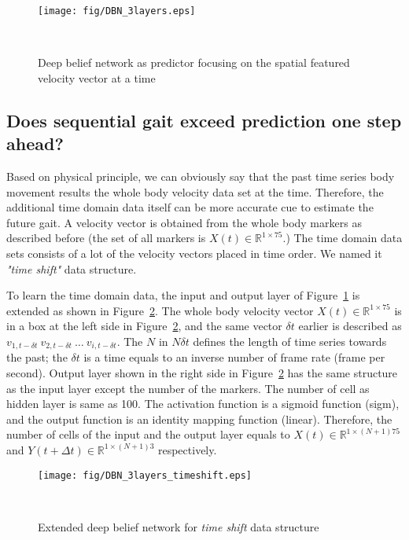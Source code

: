 \documentclass{sigchi}
\begin{document}
\begin{figure}
\centering
\hspace{10mm}\texttt{[image: fig/DBN\_3layers.eps]}\vspace{3mm}
  \caption{Deep belief network as predictor focusing on the spatial featured velocity vector at a time}~\label{fig:dbn}
\end{figure}


\subsection{Does sequential gait exceed prediction one step ahead?}

Based on physical principle, we can obviously say that the past time series body movement results the whole body velocity data set at the time. Therefore, the additional time domain data itself can be more accurate cue to estimate the future gait. A velocity vector is obtained from the whole body markers as described before (the set of all markers is $X(t)\in\mathbb{R}^{1 \times 75} $.) The time domain data sets consists of a lot of the velocity vectors placed in time order. We named it \textit{ "time shift"} data structure. 

To learn the time domain data, the input and output layer of Figure~\ref{fig:dbn} is extended as shown in Figure~\ref{fig:dbn_timeshift}. The whole body velocity vector $X(t)\in\mathbb{R}^{1 \times 75} $ is in a box at the left side in Figure~\ref{fig:dbn_timeshift}, and the same vector $\delta t$ earlier is described as $v_{1,t-\delta t} \ v_{2,t-\delta t} \ \dots \ v_{i, t-\delta t}$. The $N$ in $ N \delta t $ defines the length of time series towards the past; the $\delta t$ is a time equals to an inverse number of frame rate (frame per second). Output layer shown in the right side in Figure~\ref{fig:dbn_timeshift} has the same structure as the input layer except the number of the markers. The number of cell as hidden layer is same as 100. The activation function is a sigmoid function (sigm), and the output function is an identity mapping function (linear). Therefore, the number of cells of the input and the output  layer equals to $ X (t) \in \mathbb {R}^{1 \times (N+1)75} $ and $ Y (t + \Delta t) \in \mathbb {R} ^{1 \times (N+1)3}$ respectively. 


\begin{figure}
\centering
  \texttt{[image: fig/DBN\_3layers\_timeshift.eps]}
  \caption{Extended deep belief network for \textit{time shift} data structure}~\label{fig:dbn_timeshift}
\end{figure}
\end{document}

